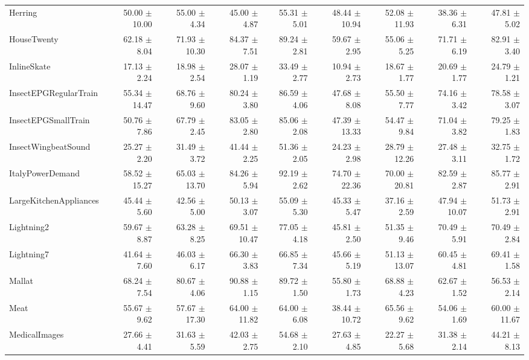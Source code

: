 \begin{landscape}
\begin{longtable}{lrrrrrrrr}
Herring & 50.00 $\pm$ 10.00 & 55.00 $\pm$ 4.34 & 45.00 $\pm$ 4.87 & 55.31 $\pm$ 5.01 & 48.44 $\pm$ 10.94 & 52.08 $\pm$ 11.93 & 38.36 $\pm$ 6.31 & 47.81 $\pm$ 5.02 \\
HouseTwenty & 62.18 $\pm$ 8.04 & 71.93 $\pm$ 10.30 & 84.37 $\pm$ 7.51 & 89.24 $\pm$ 2.81 & 59.67 $\pm$ 2.95 & 55.06 $\pm$ 5.25 & 71.71 $\pm$ 6.19 & 82.91 $\pm$ 3.40 \\
InlineSkate & 17.13 $\pm$ 2.24 & 18.98 $\pm$ 2.54 & 28.07 $\pm$ 1.19 & 33.49 $\pm$ 2.77 & 10.94 $\pm$ 2.73 & 18.67 $\pm$ 1.77 & 20.69 $\pm$ 1.77 & 24.79 $\pm$ 1.21 \\
InsectEPGRegularTrain & 55.34 $\pm$ 14.47 & 68.76 $\pm$ 9.60 & 80.24 $\pm$ 3.80 & 86.59 $\pm$ 4.06 & 47.68 $\pm$ 8.08 & 55.50 $\pm$ 7.77 & 74.16 $\pm$ 3.42 & 78.58 $\pm$ 3.07 \\
InsectEPGSmallTrain & 50.76 $\pm$ 7.86 & 67.79 $\pm$ 2.45 & 83.05 $\pm$ 2.80 & 85.06 $\pm$ 2.08 & 47.39 $\pm$ 13.33 & 54.47 $\pm$ 9.84 & 71.04 $\pm$ 3.82 & 79.25 $\pm$ 1.83 \\
InsectWingbeatSound & 25.27 $\pm$ 2.20 & 31.49 $\pm$ 3.72 & 41.44 $\pm$ 2.25 & 51.36 $\pm$ 2.05 & 24.23 $\pm$ 2.98 & 28.79 $\pm$ 12.26 & 27.48 $\pm$ 3.11 & 32.75 $\pm$ 1.72 \\
ItalyPowerDemand & 58.52 $\pm$ 15.27 & 65.03 $\pm$ 13.70 & 84.26 $\pm$ 5.94 & 92.19 $\pm$ 2.62 & 74.70 $\pm$ 22.36 & 70.00 $\pm$ 20.81 & 82.59 $\pm$ 2.87 & 85.77 $\pm$ 2.91 \\
LargeKitchenAppliances & 45.44 $\pm$ 5.60 & 42.56 $\pm$ 5.00 & 50.13 $\pm$ 3.07 & 55.09 $\pm$ 5.30 & 45.33 $\pm$ 5.47 & 37.16 $\pm$ 2.59 & 47.94 $\pm$ 10.07 & 51.73 $\pm$ 2.91 \\
Lightning2 & 59.67 $\pm$ 8.87 & 63.28 $\pm$ 8.25 & 69.51 $\pm$ 10.47 & 77.05 $\pm$ 4.18 & 45.81 $\pm$ 2.50 & 51.35 $\pm$ 9.46 & 70.49 $\pm$ 5.91 & 70.49 $\pm$ 2.84 \\
Lightning7 & 41.64 $\pm$ 7.60 & 46.03 $\pm$ 6.17 & 66.30 $\pm$ 3.83 & 66.85 $\pm$ 7.34 & 45.66 $\pm$ 5.19 & 51.13 $\pm$ 13.07 & 60.45 $\pm$ 4.81 & 69.41 $\pm$ 1.58 \\
Mallat & 68.24 $\pm$ 7.54 & 80.67 $\pm$ 4.06 & 90.88 $\pm$ 1.15 & 89.72 $\pm$ 1.50 & 55.80 $\pm$ 1.73 & 68.88 $\pm$ 4.23 & 62.67 $\pm$ 1.52 & 56.53 $\pm$ 2.14 \\
Meat & 55.67 $\pm$ 9.62 & 57.67 $\pm$ 17.30 & 64.00 $\pm$ 11.82 & 64.00 $\pm$ 6.08 & 38.44 $\pm$ 10.72 & 65.56 $\pm$ 9.62 & 54.06 $\pm$ 1.69 & 60.00 $\pm$ 11.67 \\
MedicalImages & 27.66 $\pm$ 4.41 & 31.63 $\pm$ 5.59 & 42.03 $\pm$ 2.75 & 54.68 $\pm$ 2.10 & 27.63 $\pm$ 4.85 & 22.27 $\pm$ 5.68 & 31.38 $\pm$ 2.14 & 44.21 $\pm$ 8.13 \\

\end{longtable}
\end{landscape}
